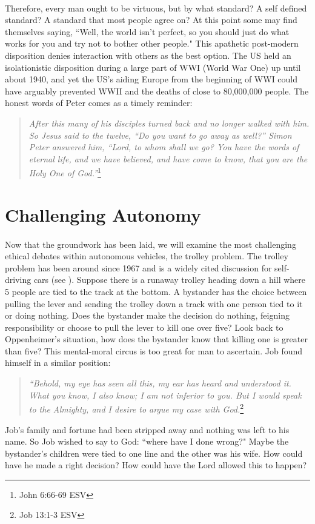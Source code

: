 \documentclass[10pt]{article}
\begin{document}
\paragraph{}
Therefore, every man ought to be virtuous, but by what standard? A self defined standard? A standard that most people agree on? At this point some may find themselves saying, ``Well, the world isn't perfect, so you should just do what works for you and try not to bother other people." This apathetic post-modern disposition denies interaction with others as the best option. The US held an isolationistic disposition during a large part of WWI (World War One) up until about 1940, and yet the US's aiding Europe from the beginning of WWI could have arguably prevented WWII and the deaths of close to 80,000,000 people. The honest words of Peter comes as a timely reminder:
{\small \begin{quote}
	\centering
	\textit{After this many of his disciples turned back and no longer walked with him. So Jesus said to the twelve, “Do you want to go away as well?” Simon Peter answered him, “Lord, to whom shall we go? You have the words of eternal life, and we have believed, and have come to know, that you are the Holy One of God.”}\footnote{John 6:66-69 ESV}
\end{quote}}
\section{Challenging Autonomy}
\paragraph{}
Now that the groundwork has been laid, we will examine the most challenging ethical debates within autonomous vehicles, the trolley problem. The trolley problem has been around since 1967 and is a widely cited discussion for self-driving cars\textsuperscript{\cite{Fleetwood2017}} (see \cite{Moral2016}). Suppose there is a runaway trolley heading down a hill where 5 people are tied to the track at the bottom. A bystander has the choice between pulling the lever and sending the trolley down a track with one person tied to it or doing nothing. Does the bystander make the decision do nothing, feigning responsibility or choose to pull the lever to kill one over five? Look back to Oppenheimer's situation, how does the bystander know that killing one is greater than five? This mental-moral circus is too great for man to ascertain. Job found himself in a similar position:
{\small \begin{quote}
	\centering
	\textit{
		“Behold, my eye has seen all this,
	my ear has heard and understood it.
		What you know, I also know;
	I am not inferior to you.
		But I would speak to the Almighty,
	and I desire to argue my case with God.}\footnote{Job 13:1-3 ESV}
\end{quote}}
Job's family and fortune had been stripped away and nothing was left to his name. So Job wished to say to God: ``where have I done wrong?" Maybe the bystander's children were tied to one line and the other was his wife. How could have he made a right decision? How could have the Lord allowed this to happen?
\end{document}
